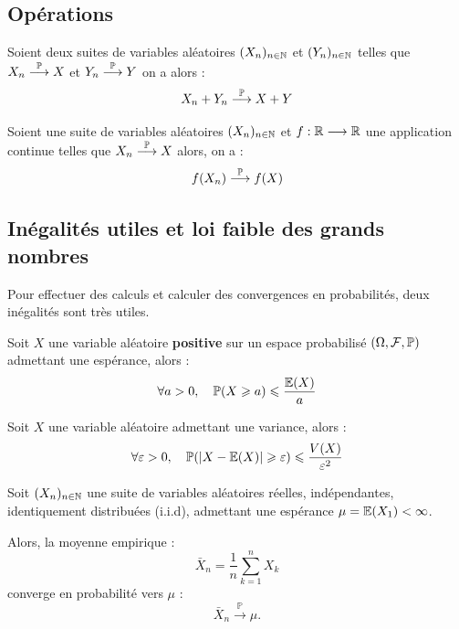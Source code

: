 \subsection{Opérations}

\begin{prop}
    Soient deux suites de variables aléatoires $(X_n)_{n \in \mathbb{N}}$ et $(Y_n)_{n \in \mathbb{N}}$ telles que 
    $X_n \overset{\mathbb{P}}{\longrightarrow} X$ et $ Y_n \overset{\mathbb{P}}{\longrightarrow} Y$ on a alors : 
        \[ X_n + Y_n \overset{\mathbb{P}}{\longrightarrow} X + Y \] 
\end{prop}

\begin{prop}
    Soient une suite de variables aléatoires $(X_n)_{n \in \mathbb{N}}$ et $f : \mathbb{R} \longrightarrow \mathbb{R}$ une application 
    continue telles que $X_n \overset{\mathbb{P}}{\longrightarrow} X$ alors, on a : 
        \[ f(X_n) \overset{\mathbb{P}}{\longrightarrow} f(X) \] 
\end{prop}

\subsection{Inégalités utiles et loi faible des grands nombres}

Pour effectuer des calculs et calculer des convergences en probabilités, deux inégalités sont très utiles. 

\begin{proposition}
    Soit $X$ une variable aléatoire \textbf{positive} sur un espace probabilisé $(\Omega, \mathcal{F}, \mathbb{P})$ 
    admettant une espérance, alors : 
        \[ \forall a > 0, \quad \mathbb{P} (X \geqslant a) \leqslant \frac{\mathbb{E}(X)}{a}  \] 
\end{proposition}

\begin{proposition}
    Soit $X$ une variable aléatoire admettant une variance, alors : 
        \[ \forall \varepsilon > 0, \quad \mathbb{P}(|X - \mathbb{E}(X)| \geqslant \varepsilon) \leqslant \frac{V(X)}{\varepsilon^2} \] 
\end{proposition}

\begin{theorem}
    Soit $(X_n)_{n \in \mathbb{N}}$ une suite de variables aléatoires réelles, indépendantes, identiquement 
    distribuées (i.i.d), admettant une espérance $\mu = \mathbb{E}(X_1) < \infty$.

    Alors, la moyenne empirique :
    \[
        \bar{X}_n = \frac{1}{n} \sum_{k=1}^{n} X_k
    \]
    converge en probabilité vers $\mu$ :
    \[
        \bar{X}_n \overset{\mathbb{P}}{\longrightarrow} \mu.
    \]
\end{theorem}

